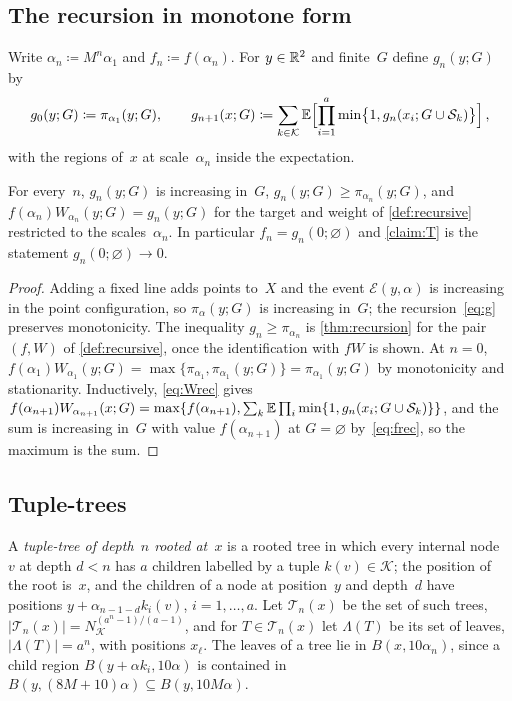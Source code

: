 \documentclass[11pt,letterpaper]{article}
\newcommand{\cS}{\mathcal S}
\renewcommand{\cE}{\mathcal E}
\begin{document}
\subsection{The recursion in monotone form}

Write $\alpha_n\coloneqq M^n\alpha_1$ and $f_n\coloneqq f(\alpha_n)$. For $y\in\mathbb R^2$ and finite~$G$ define $g_n(y;G)$ by
\begin{equation}
\label{eq:g}
  g_0(y;G)\coloneqq\pi_{\alpha_1}(y;G),\qquad g_{n+1}(x;G)\coloneqq\sum_{k\in\mathcal K}\E\Bigl[\prod_{i=1}^a\min\bigl\{1,g_n(x_i;G\cup\cS_k)\bigr\}\Bigr]\,,
\end{equation}
with the regions of~$x$ at scale~$\alpha_n$ inside the expectation.

\begin{lemma}
\label{lem:gform}
For every~$n$, $g_n(y;G)$ is increasing in~$G$, $g_n(y;G)\ge\pi_{\alpha_n}(y;G)$, and $f(\alpha_n)W_{\alpha_n}(y;G)=g_n(y;G)$ for the target and weight of \cref{def:recursive} restricted to the scales~$\alpha_n$. In particular $f_n=g_n(0;\varnothing)$ and \cref{claim:T} is the statement $g_n(0;\varnothing)\to0$.
\end{lemma}

\begin{proof}
Adding a fixed line adds points to~$X$ and the event $\cE(y,\alpha)$ is increasing in the point configuration, so $\pi_\alpha(y;G)$ is increasing in~$G$; the recursion~\eqref{eq:g} preserves monotonicity. The inequality $g_n\ge\pi_{\alpha_n}$ is \cref{thm:recursion} for the pair $(f,W)$ of \cref{def:recursive}, once the identification with $fW$ is shown. At $n=0$, $f(\alpha_1)W_{\alpha_1}(y;G)=\max\{\pi_{\alpha_1},\pi_{\alpha_1}(y;G)\}=\pi_{\alpha_1}(y;G)$ by monotonicity and stationarity. Inductively, \eqref{eq:Wrec} gives $f(\alpha_{n+1})W_{\alpha_{n+1}}(x;G)=\max\{f(\alpha_{n+1}),\sum_k\E\prod_i\min\{1,g_n(x_i;G\cup\cS_k)\}\}$, and the sum is increasing in~$G$ with value $f(\alpha_{n+1})$ at $G=\varnothing$ by~\eqref{eq:frec}, so the maximum is the sum.
\end{proof}

\subsection{Tuple-trees}

A \emph{tuple-tree of depth~$n$ rooted at~$x$} is a rooted tree in which every internal node~$v$ at depth $d<n$ has $a$ children labelled by a tuple $k(v)\in\mathcal K$; the position of the root is~$x$, and the children of a node at position~$y$ and depth~$d$ have positions $y+\alpha_{n-1-d}k_i(v)$, $i=1,\dots,a$. Let $\mathcal T_n(x)$ be the set of such trees, $\lvert\mathcal T_n(x)\rvert=N_{\mathcal K}^{(a^n-1)/(a-1)}$, and for $T\in\mathcal T_n(x)$ let $\Lambda(T)$ be its set of leaves, $\lvert\Lambda(T)\rvert=a^n$, with positions $x_\ell$. The leaves of a tree lie in $B(x,10\alpha_n)$, since a child region $B(y+\alpha k_i,10\alpha)$ is contained in $B(y,(8M+10)\alpha)\subseteq B(y,10M\alpha)$.
\end{document}
